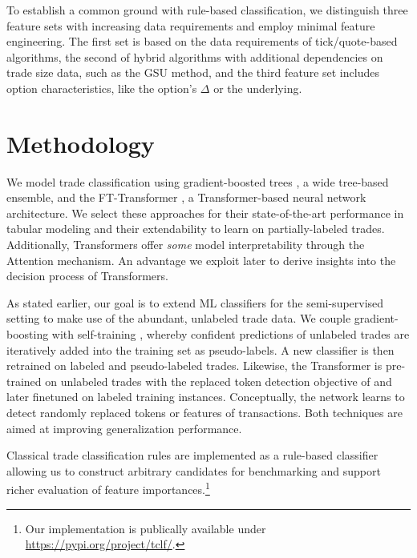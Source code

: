 To establish a common ground with rule-based classification, we distinguish three feature sets with increasing data requirements and employ minimal feature engineering. The first set is based on the data requirements of tick/quote-based algorithms, the second of hybrid algorithms with additional dependencies on trade size data, such as the \gls{GSU} method, and the third feature set includes option characteristics, like the option's $\Delta$ or the underlying. 

\section{Methodology}

We model trade classification using gradient-boosted trees \autocites[][]{friedmanGreedyFunctionApproximation2001}, a wide tree-based ensemble, and the FT-Transformer \autocite{gorishniyRevisitingDeepLearning2021}, a Transformer-based neural network architecture. We select these approaches for their state-of-the-art performance in tabular modeling \autocites[][]{gorishniyRevisitingDeepLearning2021}[][]{grinsztajnWhyTreebasedModels2022} and their extendability to learn on partially-labeled trades. Additionally, Transformers offer \textit{some} model interpretability through the Attention mechanism. An advantage we exploit later to derive insights into the decision process of Transformers.

As stated earlier, our goal is to extend \gls{ML} classifiers for the semi-supervised setting to make use of the abundant, unlabeled trade data. We couple gradient-boosting with self-training \autocite{yarowskyUnsupervisedWordSense1995}, whereby confident predictions of unlabeled trades are iteratively added into the training set as pseudo-labels. A new classifier is then retrained on labeled and pseudo-labeled trades. Likewise, the Transformer is pre-trained on unlabeled trades with the replaced token detection objective of \textcite{clarkElectraPretrainingText2020} and later finetuned on labeled training instances. Conceptually, the network learns to detect randomly replaced tokens or features of transactions. Both techniques are aimed at improving generalization performance.

Classical trade classification rules are implemented as a rule-based classifier allowing us to construct arbitrary candidates for benchmarking and support richer evaluation of feature importances.\footnote{Our implementation is publically available under \url{https://pypi.org/project/tclf/}.}

